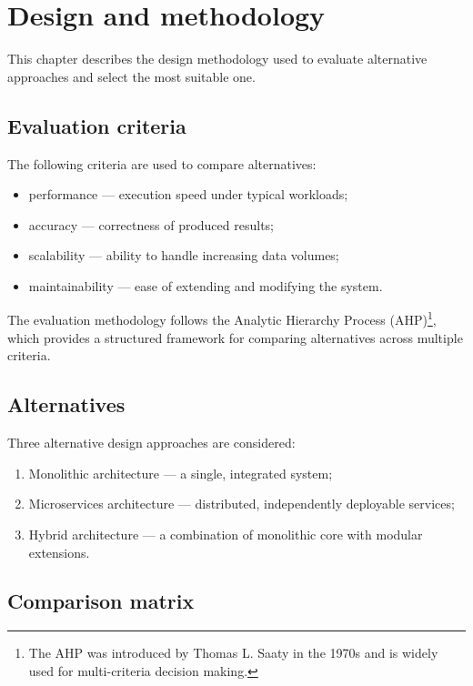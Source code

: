 \section{Design and methodology}

This chapter describes the design methodology used to evaluate alternative approaches and select the most suitable one.

\subsection{Evaluation criteria}

The following criteria are used to compare alternatives:
\begin{itemize}
    \item performance --- execution speed under typical workloads;
    \item accuracy --- correctness of produced results;
    \item scalability --- ability to handle increasing data volumes;
    \item maintainability --- ease of extending and modifying the system.
\end{itemize}

The evaluation methodology follows the Analytic Hierarchy Process (AHP)\footnote{The AHP was introduced by Thomas L. Saaty in the 1970s and is widely used for multi-criteria decision making.}, which provides a structured framework for comparing alternatives across multiple criteria.

\subsection{Alternatives}

Three alternative design approaches are considered:
\begin{enumerate}
    \item Monolithic architecture --- a single, integrated system;
    \item Microservices architecture --- distributed, independently deployable services;
    \item Hybrid architecture --- a combination of monolithic core with modular extensions.
\end{enumerate}

\subsection{Comparison matrix}

